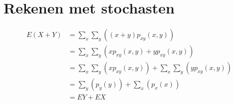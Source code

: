 \documentclass[a4paper,12px]{article}
\begin{document}


\section{Rekenen met stochasten}
    \begin{equation}
        \begin{aligned}
            E(X+Y)&=\sum_x\sum_y((x+y)p_{xy}(x,y))\\
                  &=\sum_x\sum_y(xp_{xy}(x,y)+yp_{xy}(x,y))\\
                  &=\sum_x\sum_y(xp_{xy}(x,y))+\sum_x\sum_y(yp_{xy}(x,y))\\
                  &=\sum_y(p_y(y))+\sum_x(p_x(x))\\
                  &=EY+EX
        \end{aligned}
    \end{equation}
\end{document}
